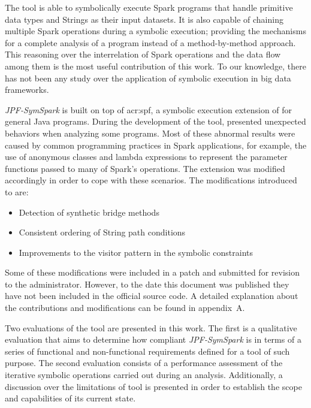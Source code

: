 The tool is able to symbolically execute Spark programs that handle primitive data types and Strings as their input datasets. It is also capable of chaining multiple Spark operations during a symbolic execution; providing the mechanisms for a complete analysis of a program instead of a method-by-method approach. This reasoning over the interrelation of Spark operations and the data flow among them is the most useful contribution of this work. To our knowledge, there has not been any study over the application of symbolic execution in big data frameworks.

\textit{JPF-SymSpark} is built on top of \acrfull{acr:spf}, a symbolic execution extension of \jpf{} for general Java programs. During the development of the tool, \spf{} presented unexpected behaviors when analyzing some programs. Most of these abnormal results were caused by common programming practices in Spark applications, for example, the use of anonymous classes and lambda expressions to represent the parameter functions passed to many of Spark's operations. The \spf{} extension was modified accordingly in order to cope with these scenarios. The modifications introduced to \spf{} are:

\begin{itemize}
	\item Detection of synthetic bridge methods
	\item Consistent ordering of String path conditions
	\item Improvements to the visitor pattern in the symbolic constraints
\end{itemize}

Some of these modifications were included in a patch and submitted for revision to the \spf{} administrator. However, to the date this document was published they have not been included in the official source code. A detailed explanation about the contributions and modifications can be found in appendix~A.

Two evaluations of the tool are presented in this work. The first is a qualitative evaluation that aims to determine how compliant \textit{JPF-SymSpark} is in terms of a series of functional and non-functional requirements defined for a tool of such purpose. The second evaluation consists of a performance assessment of the iterative symbolic operations carried out during an analysis. Additionally, a discussion over the limitations of tool is presented in order to establish the scope and capabilities of its current state.


